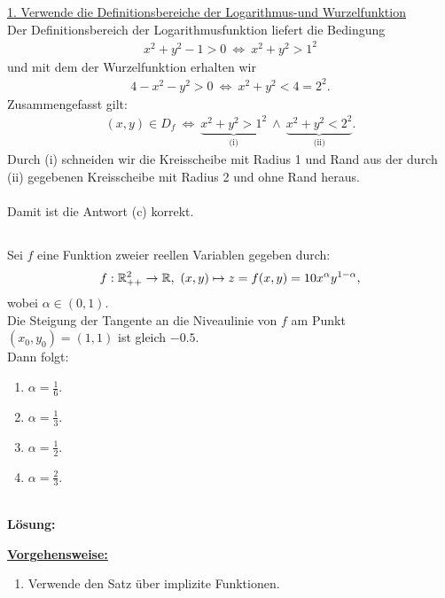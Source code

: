 \underline{1. Verwende die Definitionsbereiche der Logarithmus-und Wurzelfunktion}\\
Der Definitionsbereich der Logarithmusfunktion liefert die Bedingung
\begin{align*}
	x^2 +y^2 -1 > 0
	\ \Leftrightarrow \
	x^2 + y^2 > 1^2 
\end{align*}
und mit dem der Wurzelfunktion erhalten wir
\begin{align*}
	4 - x^2 - y^2 > 0 
	\ \Leftrightarrow \
	x^2 + y^2 < 4 = 2^2.
\end{align*} 
Zusammengefasst gilt:
\begin{align*}
	(x,y) \in D_f
	\ \Leftrightarrow \
	\underbrace{x^2 + y^2 > 1^2}_{\textrm{(i)}} \  \wedge  \ \underbrace{x^2 + y^2 <  2^2}_{\textrm{(ii)}}.
\end{align*}
Durch (i) schneiden wir die Kreisscheibe mit Radius 1 und Rand aus der durch (ii) gegebenen Kreisscheibe mit Radius 2 und ohne Rand heraus.\\
\\
Damit ist die Antwort (c) korrekt.
\newpage

\subsection*{}
Sei $ f $ eine Funktion zweier reellen Variablen gegeben durch:
\begin{align*}
	f: \mathbb{R}_{++}^2 \to \mathbb{R}, \ (x,y) \mapsto z = f(x,y) = 10 x^\alpha y^{1- \alpha},
\end{align*}
wobei $ \alpha \in (0,1) $.\\
Die Steigung der Tangente an die Niveaulinie von $ f $ am Punkt $ (x_0,y_0) = (1,1) $ ist gleich $ -0.5 $.\\
Dann folgt:
\renewcommand{\labelenumi}{(\alph{enumi})}
\begin{enumerate}
	\item 
	$ \alpha = \frac{1}{6}$.
	\item
	$ \alpha = \frac{1}{3}$.
	\item
	$ \alpha = \frac{1}{2}$.
	\item
	$ \alpha = \frac{2}{3}$.
\end{enumerate}
\ \\
\textbf{Lösung:}
\begin{mdframed}
\underline{\textbf{Vorgehensweise:}}
\renewcommand{\labelenumi}{\theenumi.}
\begin{enumerate}
\item Verwende den Satz über implizite Funktionen.
\end{enumerate}
\end{mdframed}

